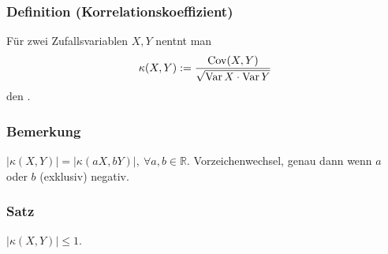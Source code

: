 \subsubsection{Definition (Korrelationskoeffizient)}
F\"ur zwei Zufallsvariablen $X,Y$ nentnt man
\[
\kappa(X,Y):=\frac{\operatorname{Cov}(X,Y)}{\sqrt{\operatorname{Var} X\cdot\operatorname{Var} Y}}
\]
den .
\subsubsection{Bemerkung}
$|\kappa(X,Y)|=|\kappa(aX,bY)|,\ \forall a,b\in\mathbb{R}$. Vorzeichenwechsel, genau dann wenn $a$ oder $b$ (exklusiv) negativ.
\subsubsection{Satz}
$|\kappa(X,Y)|\leq1$.
